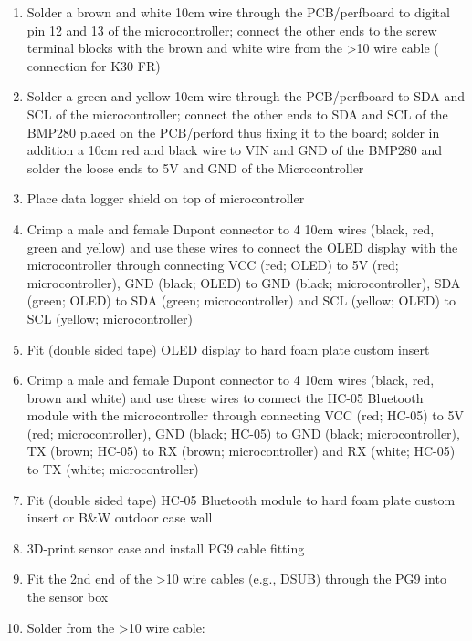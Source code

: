 \documentclass[
  11pt,
  letterpaper,
]{book}
\begin{document}
\begin{enumerate}
  terminal blocks with the green and yellow wire from the \textgreater10
  wire cable ( connection for SHT41)
\item
  Solder a brown and white 10cm wire through the PCB/perfboard to
  digital pin 12 and 13 of the microcontroller; connect the other ends
  to the screw terminal blocks with the brown and white wire from the
  \textgreater10 wire cable ( connection for K30 FR)
\item
  Solder a green and yellow 10cm wire through the PCB/perfboard to SDA
  and SCL of the microcontroller; connect the other ends to SDA and SCL
  of the BMP280 placed on the PCB/perford thus fixing it to the board;
  solder in addition a 10cm red and black wire to VIN and GND of the
  BMP280 and solder the loose ends to 5V and GND of the Microcontroller
\item
  Place data logger shield on top of microcontroller
\item
  Crimp a male and female Dupont connector to 4 10cm wires (black, red,
  green and yellow) and use these wires to connect the OLED display with
  the microcontroller through connecting VCC (red; OLED) to 5V (red;
  microcontroller), GND (black; OLED) to GND (black; microcontroller),
  SDA (green; OLED) to SDA (green; microcontroller) and SCL (yellow;
  OLED) to SCL (yellow; microcontroller)
\item
  Fit (double sided tape) OLED display to hard foam plate custom insert
\item
  Crimp a male and female Dupont connector to 4 10cm wires (black, red,
  brown and white) and use these wires to connect the HC-05 Bluetooth
  module with the microcontroller through connecting VCC (red; HC-05) to
  5V (red; microcontroller), GND (black; HC-05) to GND (black;
  microcontroller), TX (brown; HC-05) to RX (brown; microcontroller) and
  RX (white; HC-05) to TX (white; microcontroller)
\item
  Fit (double sided tape) HC-05 Bluetooth module to hard foam plate
  custom insert or B\&W outdoor case wall
\item
  3D-print sensor case and install PG9 cable fitting
\item
  Fit the 2nd end of the \textgreater10 wire cables (e.g., DSUB) through
  the PG9 into the sensor box
\item
  Solder from the \textgreater10 wire cable:
\end{enumerate}
\end{document}
